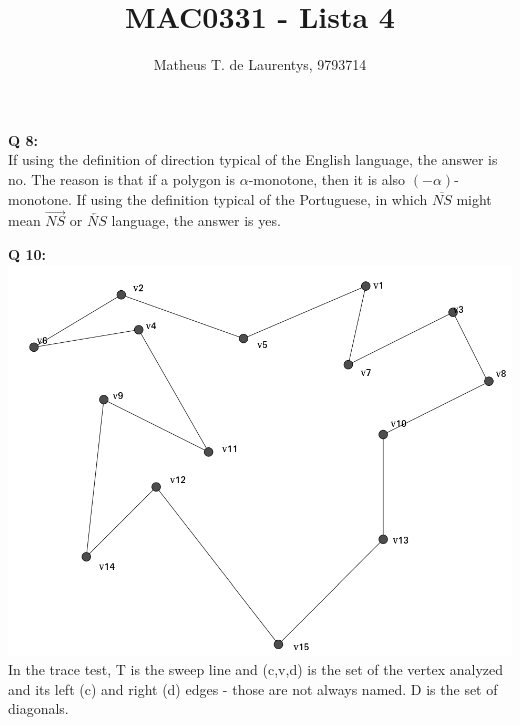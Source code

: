\documentclass[]{article}
\title{\vspace{-4.0cm}MAC0331 - Lista 4}
\author{Matheus T. de Laurentys, 9793714}
\begin{document}
	\maketitle
	\noindent
	\textbf{Q 8:} \\
	If using the definition of direction typical of the English language, the answer is no. The reason is that if a polygon is \mbox{$\alpha$-monotone}, then it is also \mbox{$(-\alpha)$-monotone}. If using the definition typical of the Portuguese, in which $\overline{NS}$ might mean $\overrightarrow{NS}$ or $\overleftarrow{NS}$ language, the answer is yes. 
	
	\textbf{Q 10:} \\
	\includegraphics[scale=0.4]{l4_im.png} \\
	In the trace test, T is the sweep line and (c,v,d) is the set of the vertex analyzed and its left (c) and right (d) edges - those are not always named. D is the set of diagonals.
\end{document}
